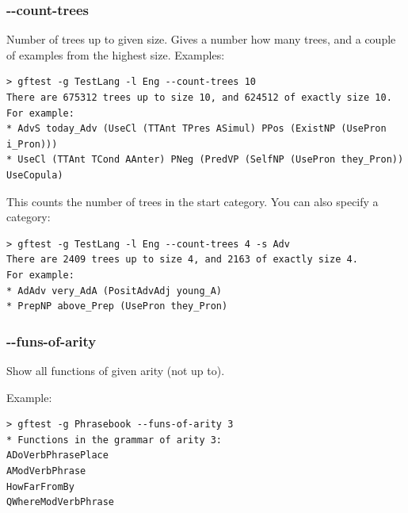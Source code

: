 \hypertarget{count-trees}{%
\subsubsection{-\/-count-trees}\label{count-trees}}

Number of trees up to given size. Gives a number how many trees, and a
couple of examples from the highest size. Examples:

\begin{verbatim}
> gftest -g TestLang -l Eng --count-trees 10
There are 675312 trees up to size 10, and 624512 of exactly size 10.
For example:
* AdvS today_Adv (UseCl (TTAnt TPres ASimul) PPos (ExistNP (UsePron i_Pron)))
* UseCl (TTAnt TCond AAnter) PNeg (PredVP (SelfNP (UsePron they_Pron)) UseCopula)
\end{verbatim}

This counts the number of trees in the start category. You can also
specify a category:

\begin{verbatim}
> gftest -g TestLang -l Eng --count-trees 4 -s Adv
There are 2409 trees up to size 4, and 2163 of exactly size 4.
For example:
* AdAdv very_AdA (PositAdvAdj young_A)
* PrepNP above_Prep (UsePron they_Pron)
\end{verbatim}

\hypertarget{funs-of-arity}{%
\subsubsection{-\/-funs-of-arity}\label{funs-of-arity}}

Show all functions of given arity (not up to).

Example:

\begin{verbatim}
> gftest -g Phrasebook --funs-of-arity 3
* Functions in the grammar of arity 3:
ADoVerbPhrasePlace
AModVerbPhrase
HowFarFromBy
QWhereModVerbPhrase
\end{verbatim}
